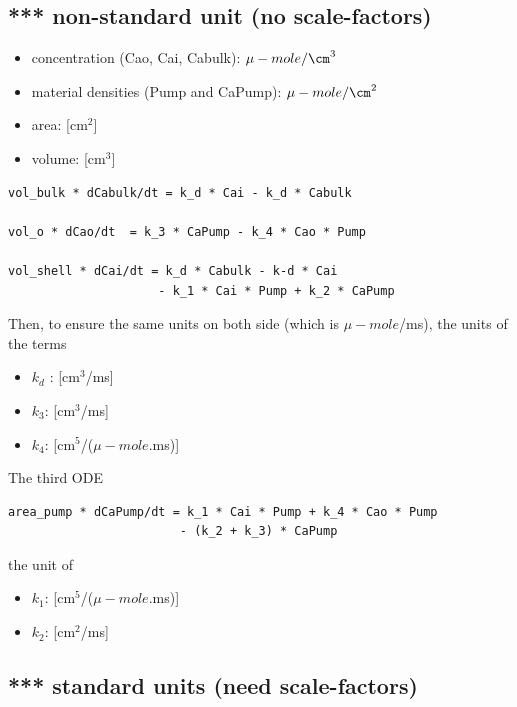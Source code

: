 \subsection{*** non-standard unit (no scale-factors)}
\begin{itemize}
  \item concentration (Cao, Cai, Cabulk): $\mu-mole/\cm^3$
  \item material densities (Pump and CaPump): $\mu-mole/\cm^2$
  \item area: [cm$^2$]
  \item volume: [cm$^3$]
\end{itemize}


\begin{verbatim}
vol_bulk * dCabulk/dt = k_d * Cai - k_d * Cabulk

vol_o * dCao/dt  = k_3 * CaPump - k_4 * Cao * Pump

vol_shell * dCai/dt = k_d * Cabulk - k-d * Cai
                     - k_1 * Cai * Pump + k_2 * CaPump
\end{verbatim}

Then, to ensure the same units on both side (which is $\mu-mole$/ms), the
units of the terms
\begin{itemize}
  \item $k_d$ : [cm$^3$/ms]
  \item $k_3$: [cm$^3$/ms]
  
  \item $k_4$: [cm$^5$/($\mu-mole$.ms)]
\end{itemize}

The third ODE
\begin{verbatim}
area_pump * dCaPump/dt = k_1 * Cai * Pump + k_4 * Cao * Pump
                        - (k_2 + k_3) * CaPump
\end{verbatim}
the unit of 
\begin{itemize}
  \item $k_1$: [cm$^5$/($\mu-mole$.ms)]
  \item $k_2$: [cm$^2$/ms]
\end{itemize}



\subsection{*** standard units (need scale-factors)}



